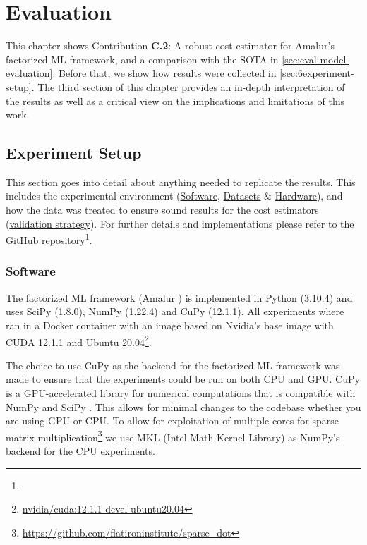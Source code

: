 
\chapter{Evaluation}
\label{chapter:evaluation-discussion}
This chapter shows Contribution \textbf{C.2}: A robust cost estimator for Amalur's factorized ML framework, and a comparison with the SOTA in \autoref{sec:eval-model-evaluation}. Before that, we show how results were collected in \autoref{sec:6experiment-setup}. The \hyperref[sec:eval-discussion]{third section} of this chapter provides an in-depth interpretation of the results as well as a critical view on the implications and limitations of this work.

\section{Experiment Setup}
\label{sec:6experiment-setup}

This section goes into detail about anything needed to replicate the results. This includes the experimental environment (\hyperref[subsec:6-software]{Software}, \hyperref[subsec:6-datasets]{Datasets} \& \hyperref[subsec:6-hardware]{Hardware}),  and how the data was treated to ensure sound results for the cost estimators (\hyperref[subsec:6-validation-strategy]{validation strategy}). For further details and implementations please refer to the GitHub repository\footnote{}.

\subsection{Software}
\label{subsec:6-software}
The factorized ML framework (Amalur \cite{amalur}) is implemented in Python (3.10.4) and uses SciPy (1.8.0), NumPy (1.22.4) and CuPy (12.1.1). All experiments where ran in a Docker container with an image based on Nvidia's base image with CUDA 12.1.1 and Ubuntu 20.04\footnote{\href{https://hub.docker.com/layers/nvidia/cuda/12.1.1-devel-ubuntu20.04/images/sha256-5bd13c67a4479a1c13238b470d89a92937ce68ba5f21b930d50c463e3314f657?context=explore}{nvidia/cuda:12.1.1-devel-ubuntu20.04}}.

The choice to use CuPy as the backend for the factorized ML framework was made to ensure that the experiments could be run on both CPU and GPU. CuPy is a GPU-accelerated library for numerical computations that is compatible with NumPy and SciPy \cite{cupy_learningsys2017}. This allows for minimal changes to the codebase whether you are using GPU or CPU. To allow for exploitation of multiple cores for sparse matrix multiplication\footnote{\url{https://github.com/flatironinstitute/sparse_dot}} we use MKL (Intel Math Kernel Library) \cite{intel-mkl} as NumPy's backend for the CPU experiments.

